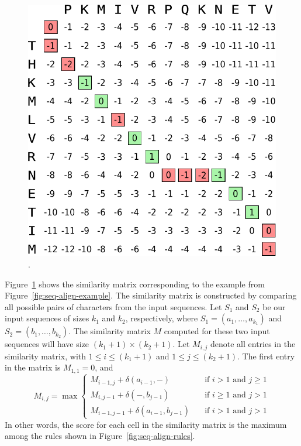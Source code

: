 \begin{figure}[h]
  \centering
  \includegraphics[scale=0.6]{src/background/figs/seq-align-example-nw}
  \caption{.}
  \label{fig:seq-align-example-nw}
\end{figure}

Figure~\ref{fig:seq-align-example-nw} shows the similarity matrix corresponding to the example from Figure~\ref{fig:seq-align-example}.
The similarity matrix is constructed by comparing all possible pairs of characters from the input sequences.
Let $S_1$ and $S_2$ be our input sequences of sizes $k_1$ and $k_2$, respectively, where $S_1 = (a_1,\ldots,a_{k_1})$ and $S_2 = (b_1,\ldots,b_{k_2})$.
The similarity matrix $M$ computed for these two input sequences will have size $(k_1 + 1) \times (k_2+1)$.
Let $M_{i,j}$ denote all entries in the similarity matrix, with $1 \leq i \leq (k_1 + 1)$ and $1 \leq j \leq (k_2 + 1)$.
The first entry in the matrix is $M_{1,1} = 0$, and
\begin{equation*}
M_{i,j} = \max \begin{cases}
  M_{i-1,j} + \delta(a_{i-1},-)         &  \quad  \text{if } i>1 \text{ and } j\geq1 \\
  M_{i,j-1} + \delta(-,b_{j-1})         &  \quad  \text{if } i\geq1 \text{ and } j>1 \\
  M_{i-1,j-1} + \delta(a_{i-1},b_{j-1}) &  \quad  \text{if } i>1 \text{ and } j>1
\end{cases}
\end{equation*}
In other words, the score for each cell in the similarity matrix is the maximum among the rules shown in Figure~\ref{fig:seq-align-rules}.

